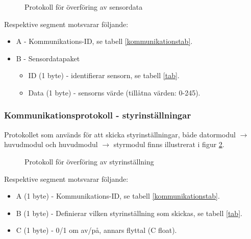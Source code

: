 \documentclass[11pt]{article}
\begin{document}
\begin{flushleft}
 \begin{figure}[H]
\centering
\noindent\resizebox{.8\linewidth}{!}{
	}
	\caption{Protokoll för överföring av sensordata\label{sensordata}}	
\end{figure} 

Respektive segment motsvarar följande: 
\begin{itemize}
	\item A - Kommunikations-ID, se tabell \ref{kommunikationstab}.
	\item B - Sensordatapaket
	\begin{itemize}
	\item ID (1 byte) - identifierar sensorn, se tabell \ref{tab}.
	\item Data (1 byte) - sensorns värde (tillåtna värden: 0-245).
	\end{itemize}
\end{itemize}

\subsubsection{Kommunikationsprotokoll - styrinställningar}
Protokollet som används för att skicka styrinställningar, både datormodul $\rightarrow$ huvudmodul och huvudmodul $\rightarrow$ styrmodul finns illustrerat i figur \ref{styrkomm}.

\begin{figure}[htbp]
\centering
\noindent\resizebox{.8\linewidth}{!}{
	}
	\caption{Protokoll för överföring av styrinställning \label{styrkomm}}	
\end{figure}

Respektive segment motsvarar följande: 
\begin{itemize}
	\item A (1 byte) - Kommunikations-ID, se tabell \ref{kommunikationstab}.
	\item B (1 byte) - Definierar vilken styrinställning som skickas, se tabell \ref{tab}.
	\item C (1 byte) - 0/1 om av/på, annars flyttal (C float).
\end{itemize}



\end{flushleft}
\end{document}
